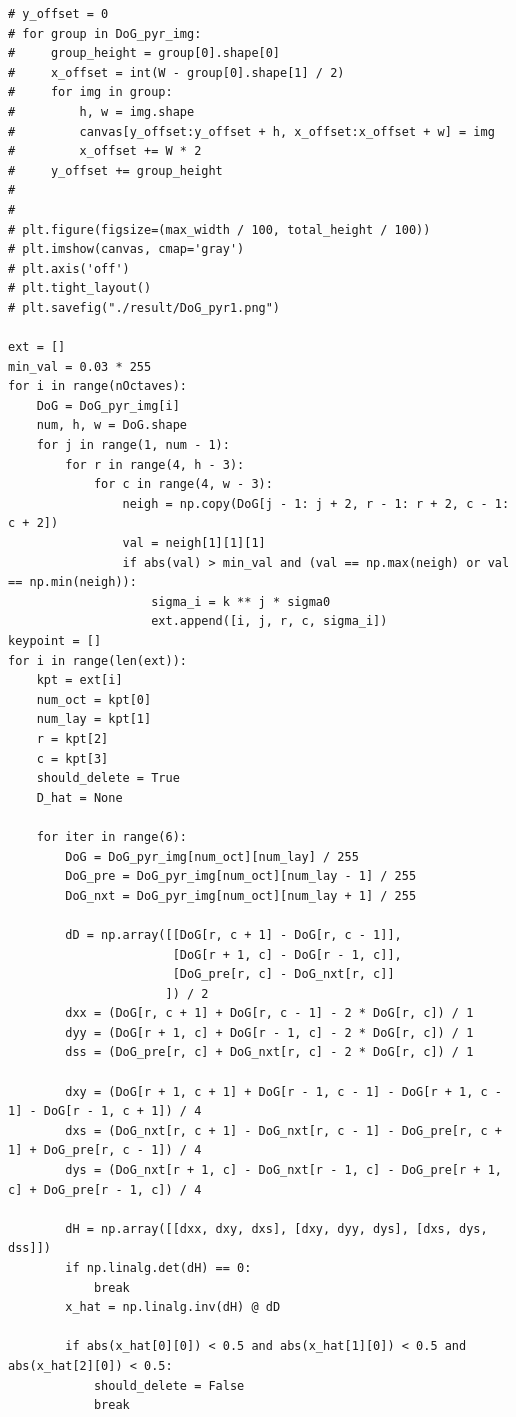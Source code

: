 \documentclass{article}
\begin{document}
\begin{lstlisting}
# y_offset = 0
# for group in DoG_pyr_img:
#     group_height = group[0].shape[0]
#     x_offset = int(W - group[0].shape[1] / 2)
#     for img in group:
#         h, w = img.shape
#         canvas[y_offset:y_offset + h, x_offset:x_offset + w] = img
#         x_offset += W * 2
#     y_offset += group_height
#
#
# plt.figure(figsize=(max_width / 100, total_height / 100))
# plt.imshow(canvas, cmap='gray')
# plt.axis('off')
# plt.tight_layout()
# plt.savefig("./result/DoG_pyr1.png")

ext = []
min_val = 0.03 * 255
for i in range(nOctaves):
    DoG = DoG_pyr_img[i]
    num, h, w = DoG.shape
    for j in range(1, num - 1):
        for r in range(4, h - 3):
            for c in range(4, w - 3):
                neigh = np.copy(DoG[j - 1: j + 2, r - 1: r + 2, c - 1: c + 2])
                val = neigh[1][1][1]
                if abs(val) > min_val and (val == np.max(neigh) or val == np.min(neigh)):
                    sigma_i = k ** j * sigma0
                    ext.append([i, j, r, c, sigma_i])
keypoint = []
for i in range(len(ext)):
    kpt = ext[i]
    num_oct = kpt[0]
    num_lay = kpt[1]
    r = kpt[2]
    c = kpt[3]
    should_delete = True
    D_hat = None

    for iter in range(6):
        DoG = DoG_pyr_img[num_oct][num_lay] / 255
        DoG_pre = DoG_pyr_img[num_oct][num_lay - 1] / 255
        DoG_nxt = DoG_pyr_img[num_oct][num_lay + 1] / 255

        dD = np.array([[DoG[r, c + 1] - DoG[r, c - 1]],
                       [DoG[r + 1, c] - DoG[r - 1, c]],
                       [DoG_pre[r, c] - DoG_nxt[r, c]]
                      ]) / 2
        dxx = (DoG[r, c + 1] + DoG[r, c - 1] - 2 * DoG[r, c]) / 1
        dyy = (DoG[r + 1, c] + DoG[r - 1, c] - 2 * DoG[r, c]) / 1
        dss = (DoG_pre[r, c] + DoG_nxt[r, c] - 2 * DoG[r, c]) / 1

        dxy = (DoG[r + 1, c + 1] + DoG[r - 1, c - 1] - DoG[r + 1, c - 1] - DoG[r - 1, c + 1]) / 4
        dxs = (DoG_nxt[r, c + 1] - DoG_nxt[r, c - 1] - DoG_pre[r, c + 1] + DoG_pre[r, c - 1]) / 4
        dys = (DoG_nxt[r + 1, c] - DoG_nxt[r - 1, c] - DoG_pre[r + 1, c] + DoG_pre[r - 1, c]) / 4

        dH = np.array([[dxx, dxy, dxs], [dxy, dyy, dys], [dxs, dys, dss]])
        if np.linalg.det(dH) == 0:
            break
        x_hat = np.linalg.inv(dH) @ dD

        if abs(x_hat[0][0]) < 0.5 and abs(x_hat[1][0]) < 0.5 and abs(x_hat[2][0]) < 0.5:
            should_delete = False
            break


\end{lstlisting}
\end{document}
